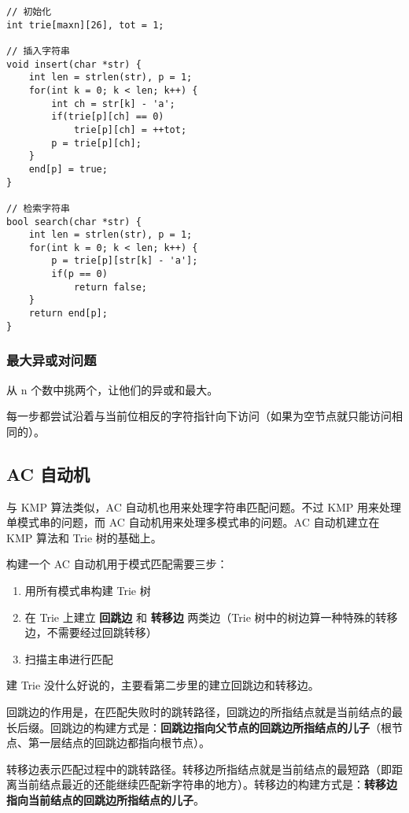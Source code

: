 \documentclass[UTF8]{article}
\begin{document}
\begin{lstlisting}[caption=Trie]
// 初始化
int trie[maxn][26], tot = 1;

// 插入字符串
void insert(char *str) {
	int len = strlen(str), p = 1;
	for(int k = 0; k < len; k++) {
		int ch = str[k] - 'a';
		if(trie[p][ch] == 0)
			trie[p][ch] = ++tot;
		p = trie[p][ch];
	}
	end[p] = true;
}

// 检索字符串
bool search(char *str) {
	int len = strlen(str), p = 1;
	for(int k = 0; k < len; k++) {
		p = trie[p][str[k] - 'a'];
		if(p == 0)
			return false;
	}
	return end[p];
}
\end{lstlisting}

\subsubsection{最大异或对问题}
从 $\mathrm{n}$ 个数中挑两个，让他们的异或和最大。

每一步都尝试沿着与当前位相反的字符指针向下访问（如果为空节点就只能访问相同的）。



\subsection{AC 自动机}
与 KMP 算法类似，AC 自动机也用来处理字符串匹配问题。不过 KMP 用来处理单模式串的问题，而 AC 自动机用来处理多模式串的问题。AC 自动机建立在 KMP 算法和 Trie 树的基础上。

构建一个 AC 自动机用于模式匹配需要三步：

\begin{enumerate}
	\item 用所有模式串构建 Trie 树
	\item 在 Trie 上建立 \textbf{回跳边} 和 \textbf{转移边} 两类边（Trie 树中的树边算一种特殊的转移边，不需要经过回跳转移）
	\item 扫描主串进行匹配
\end{enumerate}

建 Trie 没什么好说的，主要看第二步里的建立回跳边和转移边。

回跳边的作用是，在匹配失败时的跳转路径，回跳边的所指结点就是当前结点的最长后缀。回跳边的构建方式是：\textbf{回跳边指向父节点的回跳边所指结点的儿子}（根节点、第一层结点的回跳边都指向根节点）。

转移边表示匹配过程中的跳转路径。转移边所指结点就是当前结点的最短路（即距离当前结点最近的还能继续匹配新字符串的地方）。转移边的构建方式是：\textbf{转移边指向当前结点的回跳边所指结点的儿子}。
\end{document}
